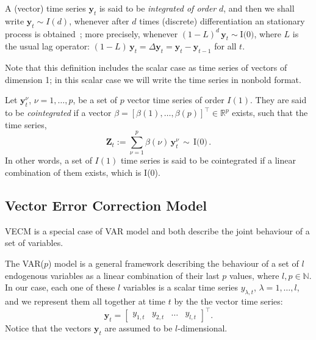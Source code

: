 \documentclass[twocolumn]{svjour3}          %
\begin{document}
A (vector) time series $\mathbf{y}_t$ is said to be {\em integrated of order\/}
$d$, and then we shall write $\mathbf{y}_t\sim I(d)$, whenever after $d$ times
(discrete) differentiation an stationary process is obtained~\cite{banerjee1993};
more precisely, whenever
$(1-L)^d\,\mathbf{y}_t\sim\text{I(0)}$, where $L$ is the usual lag operator:
$(1-L)\,\mathbf{y}_t = \Delta\mathbf{y}_t = \mathbf{y}_t-\mathbf{y}_{t-1}$ for
all $t$.  

Note that this definition includes the scalar case as time series of
vectors of dimension 1; in this scalar case we will write the time series in
nonbold format.

Let $\mathbf{y}_t^\nu$, $\nu=1,\dots,p$, be a set of $p$ vector time series of
order $I(1)$.  They are said to be {\em cointegrated\/} if a vector
$\beta=[\beta(1),\dots,\beta(p)]^\top \in \mathbb{R}^p$ exists, such that the
time series,
\begin{equation}
\mathbf{Z}_t:= 
\sum_{\nu=1}^p \beta(\nu)\,\mathbf{y}_t^\nu\,\sim\,\text{I(0)}\,.
\end{equation}
In other words, a set of $I(1)$ time series is said to be cointegrated if a
linear combination of them exists, which is I(0).


\subsection{Vector Error Correction Model}\label{sec:varvec}

VECM is a special case of VAR model and both describe the joint behaviour
of a set of variables.

The VAR($p$) model is a general framework describing the behaviour of a
set of $l$ endogenous variables as a linear combination of their last $p$
values, where $l,p\in\mathbb{N}$. 
In our case, each one of these $l$ variables is a scalar time series
$y_{\lambda,t}$, $\lambda=1,\dots,l$, and we represent them all together
at time $t$ by the the vector time series:
\begin{equation}
\label{eq:variables}
\mathbf{y}_t = 
\begin{bmatrix} y_{1,t} & y_{2,t} & \dots & y_{l,t} \end{bmatrix}^\top.
\end{equation}
\noindent
Notice that the vectors $\mathbf{y}_t$ are assumed to be $l$-dimensional.
\end{document}
